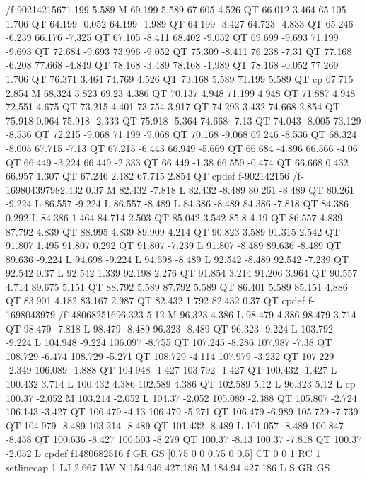 /f-902142156{71.199 5.589 M
69.199 5.589 67.605 4.526 QT
66.012 3.464 65.105 1.706 QT
64.199 -0.052 64.199 -1.989 QT
64.199 -3.427 64.723 -4.833 QT
65.246 -6.239 66.176 -7.325 QT
67.105 -8.411 68.402 -9.052 QT
69.699 -9.693 71.199 -9.693 QT
72.684 -9.693 73.996 -9.052 QT
75.309 -8.411 76.238 -7.31 QT
77.168 -6.208 77.668 -4.849 QT
78.168 -3.489 78.168 -1.989 QT
78.168 -0.052 77.269 1.706 QT
76.371 3.464 74.769 4.526 QT
73.168 5.589 71.199 5.589 QT
cp
67.715 2.854 M
68.324 3.823 69.23 4.386 QT
70.137 4.948 71.199 4.948 QT
71.887 4.948 72.551 4.675 QT
73.215 4.401 73.754 3.917 QT
74.293 3.432 74.668 2.854 QT
75.918 0.964 75.918 -2.333 QT
75.918 -5.364 74.668 -7.13 QT
74.043 -8.005 73.129 -8.536 QT
72.215 -9.068 71.199 -9.068 QT
70.168 -9.068 69.246 -8.536 QT
68.324 -8.005 67.715 -7.13 QT
67.215 -6.443 66.949 -5.669 QT
66.684 -4.896 66.566 -4.06 QT
66.449 -3.224 66.449 -2.333 QT
66.449 -1.38 66.559 -0.474 QT
66.668 0.432 66.957 1.307 QT
67.246 2.182 67.715 2.854 QT
cp}def
f-902142156
/f-1698043979{82.432 0.37 M
82.432 -7.818 L
82.432 -8.489 80.261 -8.489 QT
80.261 -9.224 L
86.557 -9.224 L
86.557 -8.489 L
84.386 -8.489 84.386 -7.818 QT
84.386 0.292 L
84.386 1.464 84.714 2.503 QT
85.042 3.542 85.8 4.19 QT
86.557 4.839 87.792 4.839 QT
88.995 4.839 89.909 4.214 QT
90.823 3.589 91.315 2.542 QT
91.807 1.495 91.807 0.292 QT
91.807 -7.239 L
91.807 -8.489 89.636 -8.489 QT
89.636 -9.224 L
94.698 -9.224 L
94.698 -8.489 L
92.542 -8.489 92.542 -7.239 QT
92.542 0.37 L
92.542 1.339 92.198 2.276 QT
91.854 3.214 91.206 3.964 QT
90.557 4.714 89.675 5.151 QT
88.792 5.589 87.792 5.589 QT
86.401 5.589 85.151 4.886 QT
83.901 4.182 83.167 2.987 QT
82.432 1.792 82.432 0.37 QT
cp}def
f-1698043979
/f1480682516{96.323 5.12 M
96.323 4.386 L
98.479 4.386 98.479 3.714 QT
98.479 -7.818 L
98.479 -8.489 96.323 -8.489 QT
96.323 -9.224 L
103.792 -9.224 L
104.948 -9.224 106.097 -8.755 QT
107.245 -8.286 107.987 -7.38 QT
108.729 -6.474 108.729 -5.271 QT
108.729 -4.114 107.979 -3.232 QT
107.229 -2.349 106.089 -1.888 QT
104.948 -1.427 103.792 -1.427 QT
100.432 -1.427 L
100.432 3.714 L
100.432 4.386 102.589 4.386 QT
102.589 5.12 L
96.323 5.12 L
cp
100.37 -2.052 M
103.214 -2.052 L
104.37 -2.052 105.089 -2.388 QT
105.807 -2.724 106.143 -3.427 QT
106.479 -4.13 106.479 -5.271 QT
106.479 -6.989 105.729 -7.739 QT
104.979 -8.489 103.214 -8.489 QT
101.432 -8.489 L
101.057 -8.489 100.847 -8.458 QT
100.636 -8.427 100.503 -8.279 QT
100.37 -8.13 100.37 -7.818 QT
100.37 -2.052 L
cp}def
f1480682516
f
GR
GS
[0.75 0 0 0.75 0 0.5] CT
0 0 1 RC
1 setlinecap
1 LJ
2.667 LW
N
154.946 427.186 M
184.94 427.186 L
S
GR
GS
